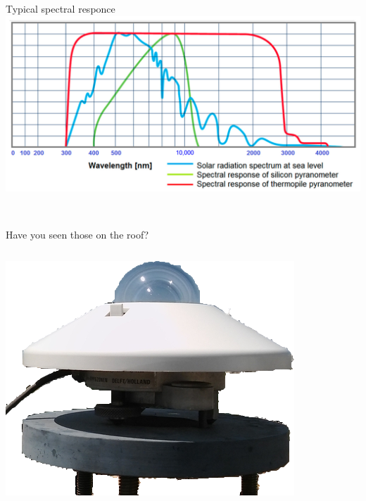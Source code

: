 \documentclass[
  ignorenonframetext,
]{beamer}
\begin{document}
\begin{frame}[fragile]
\begin{block}{Typical spectral responce}
\protect\hypertarget{typical-spectral-responce}{}
\includegraphics{images/energies-14-02766-g003.webp}

~ ~ ~ ~ ~ ~

\end{block}

\begin{block}{Have you seen those on the roof?}
\protect\hypertarget{have-you-seen-those-on-the-roof}{}
\begin{columns}[T]
\begin{column}{0.5\textwidth}
\includegraphics{images/cm21.png}
\end{column}


\end{columns}
\end{block}
\end{frame}
\end{document}
